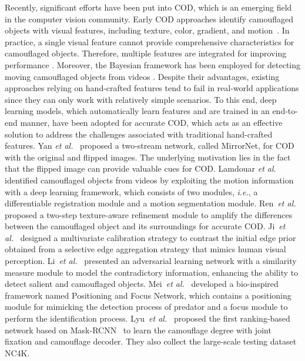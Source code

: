 \documentclass[lettersize,journal]{IEEEtran}
\def\ie{\emph{i.e.}}
\def\etal{{\em et al.}}
\def\etal{{\em et al.}}
\begin{document}
Recently, significant efforts have been put into COD, which is an emerging field in the computer vision community.
Early COD approaches identify camouflaged objects with visual features, including texture, color, gradient, and motion~\cite{survey}.
In practice, a single visual feature cannot provide comprehensive characteristics for camouflaged objects.
Therefore, multiple features are integrated for improving performance \cite{comb1}.
Moreover, the Bayesian framework has been employed for detecting moving camouflaged objects from videos \cite{Bayesian}.
Despite their advantages, existing approaches relying on hand-crafted features tend to fail in real-world applications since they can only work with relatively simple scenarios. 
To this end, deep learning models, which automatically learn features and are trained in an end-to-end manner, have been adopted for accurate COD, which acts as an effective solution to address the challenges associated with traditional hand-crafted features.
Yan \etal~\cite{mirrornet} proposed a two-stream network, called MirrorNet, for COD with the original and flipped images. The underlying motivation lies in the fact that the flipped image can provide valuable cues for COD.
Lamdouar \etal~\cite{video} identified camouflaged objects from videos by exploiting the motion information with a deep learning framework, which consists of two modules, \ie, a differentiable registration module and a motion segmentation module. 
Ren~\etal~\cite{TANet} proposed a two-step texture-aware refinement module to amplify the differences between the camouflaged object and its surroundings for accurate COD.
Ji~\etal~\cite{errnet} designed a multivariate calibration strategy to contrast the initial edge prior obtained from a selective edge aggregation strategy that mimics human visual perception.
Li~\etal~\cite{li2021uncertainty} presented an adversarial learning network with a similarity measure module to model the contradictory information, enhancing the ability to detect salient and camouflaged objects.
Mei~\etal~\cite{pfnet} developed a bio-inspired framework named Positioning and Focus Network, which contains a positioning module for mimicking the detection process of predator and a focus module to perform the identification process.
Lyu~\etal~\cite{lsr} proposed the first ranking-based network based on Mask-RCNN~\cite{maskrcnn} to learn the camouflage degree with joint fixation and camouflage decoder. They also collect the large-scale testing dataset NC4K.
\end{document}
